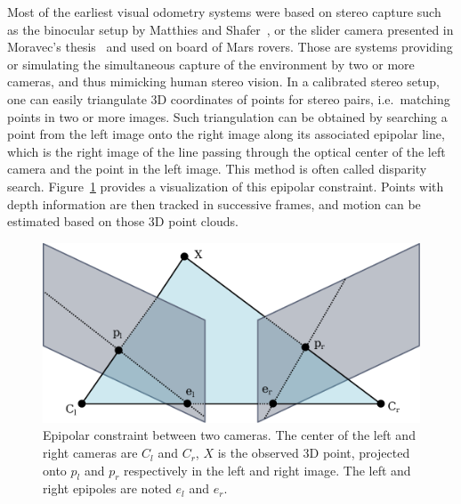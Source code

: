 Most of the earliest visual odometry systems were based on stereo capture
such as the binocular setup by Matthies and Shafer~\cite{matthies1987error},
or the slider camera presented in Moravec's thesis~\cite{moravec1980obstacle}
and used on board of Mars rovers.
Those are systems providing or simulating the simultaneous capture
of the environment by two or more cameras, and thus mimicking human stereo vision.
In a calibrated stereo setup, one can easily triangulate 3D coordinates
of points for stereo pairs, i.e.\ matching points in two or more images.
Such triangulation can be obtained by searching a point from the left image
onto the right image along its associated epipolar line,
which is the right image of the line passing through the optical center
of the left camera and the point in the left image.
This method is often called disparity search.
Figure~\ref{fig:epipolar} provides a visualization of this epipolar constraint.
Points with depth information are then tracked in successive frames,
and motion can be estimated based on those 3D point clouds.

\begin{figure}[h]
	\centering
	\includegraphics[width=\linewidth]{assets/img/epipolar.pdf}
	\caption{Epipolar constraint between two cameras.
	The center of the left and right cameras are $C_l$ and $C_r$,
	$X$ is the observed 3D point, projected onto $p_l$ and $p_r$
	respectively in the left and right image.
	The left and right epipoles are noted $e_l$ and $e_r$.}%
	\label{fig:epipolar}
\end{figure}

